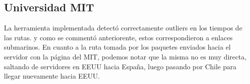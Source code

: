 \subsection{Universidad MIT}
La herramienta implementada detectó correctamente outliers en los tiempos de las rutas. y como se commentó anteriorente, estos correspondieron a enlaces submarinos. En cuanto a la ruta tomada por los paquetes enviados hacia el servidor con la página del MIT, podemos notar que la misma no es muy directa, saltando de servidores en EEUU hacia España, luego pasando por Chile para llegar nuevamente hacia EEUU. 
